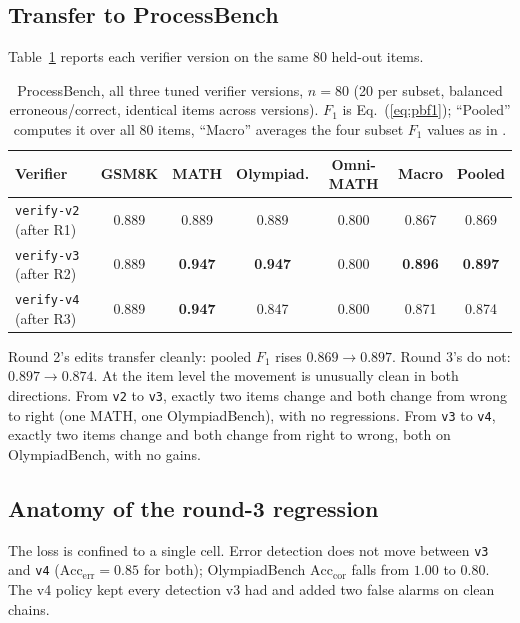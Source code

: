 \documentclass{article} %
\begin{document}
\subsection{Transfer to ProcessBench}

Table~\ref{tab:processbench} reports each verifier version on the same 80 held-out items.

\begin{table}[t]
\caption{ProcessBench, all three tuned verifier versions, $n = 80$ (20 per subset, balanced
erroneous/correct, identical items across versions). $F_1$ is Eq.~(\ref{eq:pbf1}); ``Pooled''
computes it over all 80 items, ``Macro'' averages the four subset $F_1$ values as in
\citet{zheng2024processbench}.}
\label{tab:processbench}
\begin{center}
\begin{tabular}{lcccccc}
\toprule
Verifier & GSM8K & MATH & Olympiad. & Omni-MATH & Macro & Pooled \\
\midrule
\texttt{verify-v2} (after R1) & 0.889 & 0.889 & 0.889 & 0.800 & 0.867 & 0.869 \\
\texttt{verify-v3} (after R2) & 0.889 & \textbf{0.947} & \textbf{0.947} & 0.800 & \textbf{0.896} & \textbf{0.897} \\
\texttt{verify-v4} (after R3) & 0.889 & \textbf{0.947} & 0.847 & 0.800 & 0.871 & 0.874 \\
\bottomrule
\end{tabular}
\end{center}
\end{table}

Round 2's edits transfer cleanly: pooled $F_1$ rises $0.869 \rightarrow 0.897$. Round 3's do
not: $0.897 \rightarrow 0.874$. At the item level the movement is unusually clean in both
directions. From \texttt{v2} to \texttt{v3}, exactly two items change and both change from
wrong to right (one MATH, one OlympiadBench), with no regressions. From \texttt{v3} to
\texttt{v4}, exactly two items change and both change from right to wrong, both on
OlympiadBench, with no gains.

\subsection{Anatomy of the round-3 regression}

The loss is confined to a single cell. Error detection does not move between \texttt{v3} and
\texttt{v4} ($\mathrm{Acc}_{\mathrm{err}} = 0.85$ for both); OlympiadBench
$\mathrm{Acc}_{\mathrm{cor}}$ falls from $1.00$ to $0.80$. The v4 policy kept every detection
v3 had and added two false alarms on clean chains.
\end{document}
